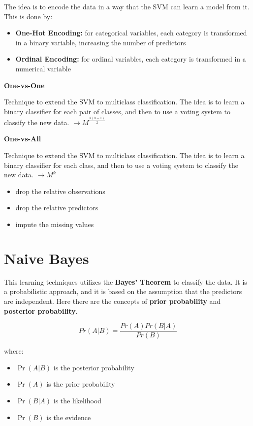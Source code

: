 \begin{definitionblock}[Encoding]
    The idea is to encode the data in a way that the SVM can learn a model from it. This is done by:
    \begin{itemize}
        \item \textbf{One-Hot Encoding:} for categorical variables, each category is transformed in a binary variable, increasing the number of predictors
        \item \textbf{Ordinal Encoding:} for ordinal variables, each category is transformed in a numerical variable
    \end{itemize}
\end{definitionblock}

\textbf{One-vs-One}

Technique to extend the SVM to multiclass classification. The idea is to learn a binary classifier for each pair of classes, and then to use a voting system to classify the new data. $\to M^{\frac{k(k-1)}{2}}$ 

\textbf{One-vs-All}

Technique to extend the SVM to multiclass classification. The idea is to learn a binary classifier for each class, and then to use a voting system to classify the new data. $\to M^k$

\begin{warningblock}
    \begin{itemize}
        \item drop the relative observations
        \item drop the relative predictors
        \item impute the missing values
    \end{itemize}
\end{warningblock}

\section{Naive Bayes}

This learning techniques utilizes the \textbf{Bayes' Theorem} to classify the data. It is a probabilistic approach, and it is based on the assumption that the predictors are independent. Here there are the concepts of \textbf{prior probability} and \textbf{posterior probability}.

$$Pr(A|B) = \frac{Pr(A)Pr(B|A)}{Pr(B)}$$

where:
\begin{itemize}
    \item $\Pr(A|B)$ is the posterior probability
    \item $\Pr(A)$ is the prior probability
    \item $\Pr(B|A)$ is the likelihood
    \item $\Pr(B)$ is the evidence
\end{itemize}

